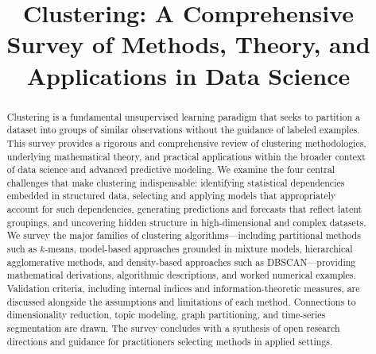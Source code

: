 \documentclass[conference]{IEEEtran}
\begin{document}
\title{Clustering: A Comprehensive Survey of Methods, Theory, and Applications in Data Science}

\author{
\and
{}
}

\maketitle

\begin{abstract}
Clustering is a fundamental unsupervised learning paradigm that seeks to partition a dataset into groups of similar observations without the guidance of labeled examples. This survey provides a rigorous and comprehensive review of clustering methodologies, underlying mathematical theory, and practical applications within the broader context of data science and advanced predictive modeling. We examine the four central challenges that make clustering indispensable: identifying statistical dependencies embedded in structured data, selecting and applying models that appropriately account for such dependencies, generating predictions and forecasts that reflect latent groupings, and uncovering hidden structure in high-dimensional and complex datasets. We survey the major families of clustering algorithms---including partitional methods such as $k$-means, model-based approaches grounded in mixture models, hierarchical agglomerative methods, and density-based approaches such as DBSCAN---providing mathematical derivations, algorithmic descriptions, and worked numerical examples. Validation criteria, including internal indices and information-theoretic measures, are discussed alongside the assumptions and limitations of each method. Connections to dimensionality reduction, topic modeling, graph partitioning, and time-series segmentation are drawn. The survey concludes with a synthesis of open research directions and guidance for practitioners selecting methods in applied settings.
\end{abstract}
\end{document}
